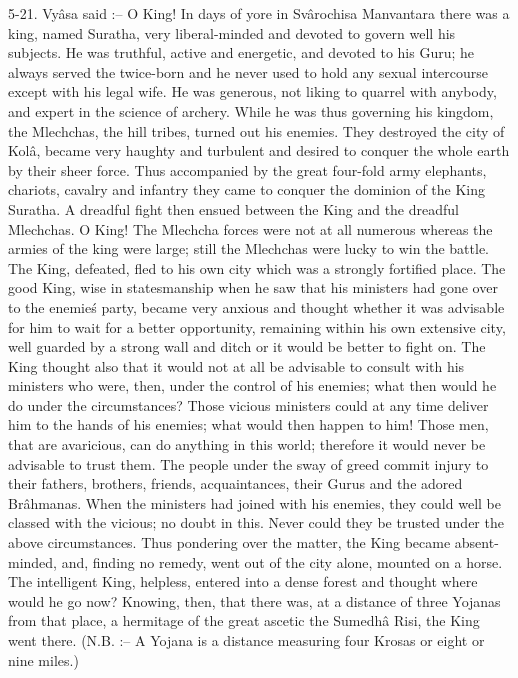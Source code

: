 5-21. Vy\^asa said :-- O King! In days of yore in Sv\^arochisa Manvantara there was a king, named Suratha, very liberal-minded and devoted to govern well his subjects. He was truthful, active and energetic, and devoted to his Guru; he always served the twice-born and he never used to hold any sexual intercourse except with his legal wife. He was generous, not liking to quarrel with anybody, and expert in the science of archery. While he was thus governing his kingdom, the Mlechchas, the hill tribes, turned out his enemies. They destroyed the city of Kol\^a, became very haughty and turbulent and desired to conquer the whole earth by their sheer force. Thus accompanied by the great four-fold army elephants, chariots, cavalry and infantry they came to conquer the dominion of the King Suratha. A dreadful fight then ensued between the King and the dreadful Mlechchas. O King! The Mlechcha forces were not at all numerous whereas the armies of the king were large; still the Mlechchas were lucky to win the battle. The King, defeated, fled to his own city which was a strongly fortified place. The good King, wise in statesmanship when he saw that his ministers had gone over to the enemie\'s party, became very anxious and thought whether it was advisable for him to wait for a better opportunity, remaining within his own extensive city, well guarded by a strong wall and ditch or it would be better to fight on. The King thought also that it would not at all be advisable to consult with his ministers who were, then, under the control of his enemies; what then would he do under the circumstances? Those vicious ministers could at any time deliver him to the hands of his enemies; what would then happen to him! Those men, that are avaricious, can do anything in this world; therefore it would never be advisable to trust them. The people under the sway of greed commit injury to their fathers, brothers, friends, acquaintances, their Gurus and the adored Br\^ahmanas. When the ministers had joined with his enemies, they could well be classed with the vicious; no doubt in this. Never could they be trusted under the above circumstances. Thus pondering over the matter, the King became absent-minded, and, finding no remedy, went out of the city alone, mounted on a horse. The intelligent King, helpless, entered into a dense forest and thought where would he go now? Knowing, then, that there was, at a distance of three Yojanas from that place, a hermitage of the great ascetic the Sumedh\^a Risi, the King went there. (N.B. :-- A Yojana is a distance measuring four Krosas or eight or nine miles.)

